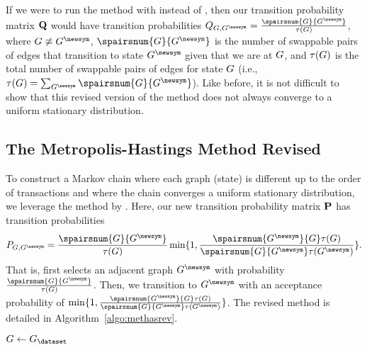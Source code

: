 If we were to run the \naive{} method with \findadjrev{} instead of \findadj{},
then our transition probability matrix $\mathbf{Q}$ would have transition
probabilities $\tprobmatov{\graph}{\graphadj} =
\frac{\spairsnum{\graph}{\graphadj}}{\graphadjnum{\graph}}$, where $\graph
\not\equiv \graphadj$, $\spairsnum{\graph}{\graphadj}$ is the number of
swappable pairs of edges that transition to state $\graphadj$ given that we are
at $\graph$, and $\tau(G)$ is the total number of swappable pairs
of edges for state $\graph$ (i.e., $\graphadjnum{\graph} = \sum_{\graphadj}
\spairsnum{\graph}{\graphadj}$). Like before, it is not difficult to show that
this revised version of the \naive{} method does not always converge to a
uniform stationary distribution.

\subsection{The Metropolis-Hastings Method Revised}

To construct a Markov chain where each graph (state) is different up to the
order of transactions and where the chain converges a uniform stationary
distribution, we leverage the \methas{} method by \citet{GionisMMT07}.
Here, our new transition probability matrix $\mathbf{P}$ has transition
probabilities
\[
  \tprobmatnv{\graph}{\graphadj} =
  \frac{\spairsnum{\graph}{\graphadj}}{\graphadjnum{\graph}} \min\{1,
  \frac{\spairsnum{\graphadj}{\graph}
  \graphadjnum{\graph}}{\spairsnum{\graph}{\graphadj}
  \graphadjnum{\graphadj}}\}.
\]
That is, \findadjrev{} first selects an adjacent graph $\graphadj$ with
probability $\frac{\spairsnum{\graph}{\graphadj}}{\graphadjnum{\graph}}$. Then,
we transition to $\graphadj$ with an acceptance probability of $\min\{1,
\frac{\spairsnum{\graphadj}{\graph}
\graphadjnum{\graph}}{\spairsnum{\graph}{\graphadj} \graphadjnum{\graphadj}}\}$.
The revised \methas{} method is detailed in Algorithm~\ref{algo:methasrev}.

\begin{algorithm}
	\caption{\methasrev}\label{algo:methasrev}
	\DontPrintSemicolon{}

	$\graph \leftarrow \graph_\dataset$\;
	\Return{$\graph$}
\end{algorithm}

